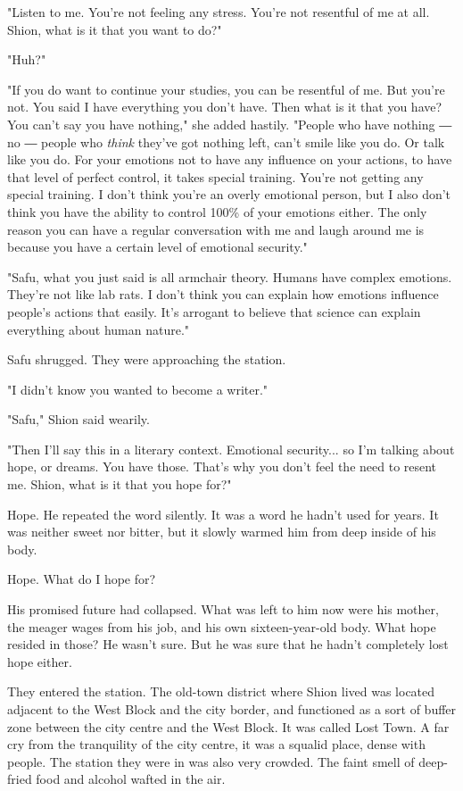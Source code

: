 "Listen to me. You're not feeling any stress. You're not resentful of me
at all. Shion, what is it that you want to do?"

"Huh?"

"If you do want to continue your studies, you can be resentful of me.
But you're not. You said I have everything you don't have. Then what is
it that you have? You can't say you have nothing," she added hastily.
"People who have nothing ― no ― people who \emph{think} they've got nothing
left, can't smile like you do. Or talk like you do. For your emotions
not to have any influence on your actions, to have that level of perfect
control, it takes special training. You're not getting any special
training. I don't think you're an overly emotional person, but I also
don't think you have the ability to control 100\% of your emotions
either. The only reason you can have a regular conversation with me and
laugh around me is because you have a certain level of emotional
security."

"Safu, what you just said is all armchair theory. Humans have complex
emotions. They're not like lab rats. I don't think you can explain how
emotions influence people's actions that easily. It's arrogant to
believe that science can explain everything about human nature."

Safu shrugged. They were approaching the station.

"I didn't know you wanted to become a writer."

"Safu," Shion said wearily.

"Then I'll say this in a literary context. Emotional security... so I'm
talking about hope, or dreams. You have those. That's why you don't feel
the need to resent me. Shion, what is it that you hope for?"

\mybreak

Hope. He repeated the word silently. It was a word he hadn't used for
years. It was neither sweet nor bitter, but it slowly warmed him from
deep inside of his body.

Hope. What do I hope for?

\myspace

His promised future had collapsed. What was left to him now were his
mother, the meager wages from his job, and his own sixteen-year-old
body. What hope resided in those? He wasn't sure. But he was sure that
he hadn't completely lost hope either.

They entered the station. The old-town district where Shion lived was
located adjacent to the West Block and the city border, and functioned
as a sort of buffer zone between the city centre and the West Block. It
was called Lost Town. A far cry from the tranquility of the city centre,
it was a squalid place, dense with people. The station they were in was
also very crowded. The faint smell of deep-fried food and alcohol wafted
in the air.

